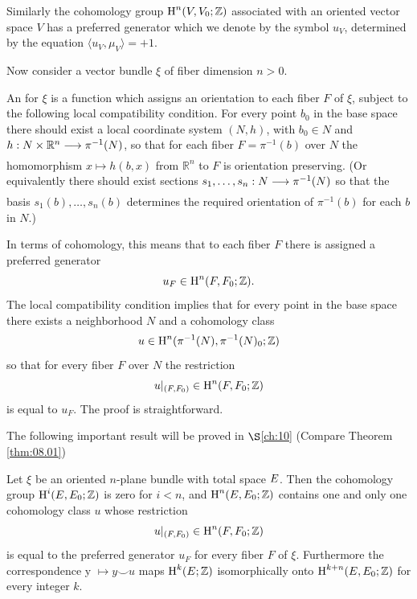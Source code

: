 \documentclass[../main]{subfiles}
\begin{document}
Similarly the cohomology group $\operatorname{H}^{n}(V, V_{0} ; \mathbb{Z})$ associated with an oriented vector space $V$ has a preferred generator which we denote by the symbol $u_{V}$, determined by the equation $\langle u_{V}, \mu_{V}\rangle=+1$.

Now consider a vector bundle $\xi$ of fiber dimension $n>0$.

\begin{definition} An  for $\xi$ is a function which assigns an orientation to each fiber $F$ of $\xi$, subject to the following local compatibility condition. For every point $b_{0}$ in the base space there should exist a local coordinate system $(N, h)$, with $b_{0} \in N$ and $h: N \times \mathbb{R}^{n} \varrightarrow{} \pi^{-1}(N)$, so that for each fiber $F=\pi^{-1} (b)$ over $N$ the homomorphism $x \mapsto h(b, x)$ from $\mathbb{R}^n$ to $F$ is orientation preserving. (Or equivalently there should exist sections $s_{1}, \ldots, s_{n}: N \varrightarrow{} \pi^{-1}(N)$ so that the basis $s_{1}(b), \ldots, s_{n}(b)$ determines the required orientation of $\pi^{-1}(b)$ for each $b$ in $N$.)

\end{definition}

In terms of cohomology, this means that to each fiber $F$ there is assigned a preferred generator
\[
u_{F} \in \operatorname{H}^{n}(F, F_{0} ; \mathbb{Z}) .
\]
The local compatibility condition implies that for every point in the base space there exists a neighborhood $N$ and a cohomology class
\[
u \in \operatorname{H}^{n}(\pi^{-1}(N), \pi^{-1}(N)_{0} ; \mathbb{Z})
\]
so that for every fiber $F$ over $N$ the restriction
\[
u|_{(F, F_{0})} \in \operatorname{H}^{n}(F, F_{0} ; \mathbb{Z})
\]
is equal to $u_{F}$. The proof is straightforward.

The following important result will be proved in $\S$\ref{ch:10} (Compare Theorem \ref{thm:08.01})

\begin{theorem}\label{thm:09.01} Let $\xi$ be an oriented $n$-plane bundle with total space $E$. Then the cohomology group $\operatorname{H}^{i}(E, E_{0} ; \mathbb{Z})$ is zero for $i<n$, and $\operatorname{H}^{n}(E, E_{0} ; \mathbb{Z})$ contains one and only one cohomology class $u$ whose restriction
\[
u |_{(F, F_{0})} \in \operatorname{H}^{n}(F, F_{0} ; \mathbb{Z})
\]
is equal to the preferred generator $u_{F}$ for every fiber $F$ of $\xi$. Furthermore the correspondence y $\mapsto y \smile u$ maps $\operatorname{H}^{k}(E ; \mathbb{Z})$ isomorphically onto $\operatorname{H}^{k+n}(E, E_{0} ; \mathbb{Z})$ for every integer $k$.

\end{theorem}
\end{document}

